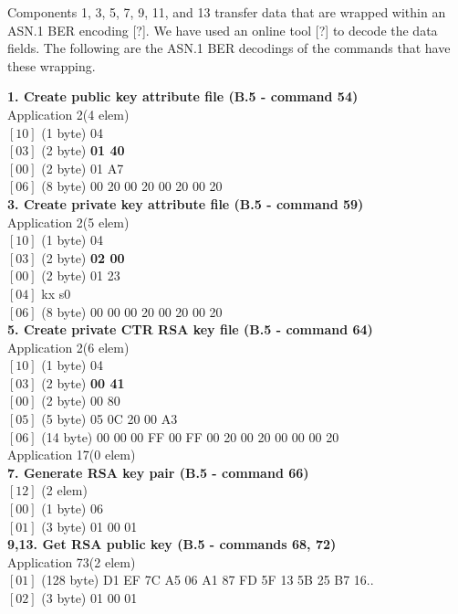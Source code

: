 \documentclass[bsc,frontabs,twoside,singlespacing,parskip,deptreport]{infthesis}     %
\begin{document}
Components 1, 3, 5, 7, 9, 11, and 13 transfer data that are wrapped within an ASN.1 BER encoding [?]. We have used an online tool [?] to decode the data fields. The following are the ASN.1 BER decodings of the commands that have these wrapping. 

\textbf{1. Create public key attribute file (B.5 - command 54)}\\
Application 2(4 elem)\\
$[10]$ (1 byte) 04\\
$[03]$ (2 byte) \textbf{01 40}\\
$[00]$ (2 byte) 01 A7\\
$[06]$ (8 byte) 00 20 00 20 00 20 00 20\\

\textbf{3. Create private key attribute file (B.5 - command 59)}\\
Application 2(5 elem)\\
$[10]$ (1 byte) 04\\
$[03]$ (2 byte) \textbf{02 00}\\
$[00]$ (2 byte) 01 23\\
$[04]$ kx s0\\
$[06]$ (8 byte) 00 00 00 20 00 20 00 20\\

\textbf{5. Create private CTR RSA key file (B.5 - command 64)}\\
Application 2(6 elem)\\
$[10]$ (1 byte) 04\\
$[03]$ (2 byte) \textbf{00 41}\\
$[00]$ (2 byte) 00 80\\
$[05]$ (5 byte) 05 0C 20 00 A3\\
$[06]$ (14 byte) 00 00 00 FF 00 FF 00 20 00 20 00 00 00 20\\
Application 17(0 elem)\\

\textbf{7. Generate RSA key pair (B.5 - command 66)}\\
$[12]$ (2 elem)\\
$[00]$ (1 byte) 06\\
$[01]$ (3 byte) 01 00 01\\

\textbf{9,13. Get RSA public key (B.5 - commands 68, 72)}\\
Application 73(2 elem)\\
$[01]$ (128 byte) D1 EF 7C A5 06 A1 87 FD 5F 13 5B 25 B7 16..\\
$[02]$ (3 byte) 01 00 01\\
\end{document}
